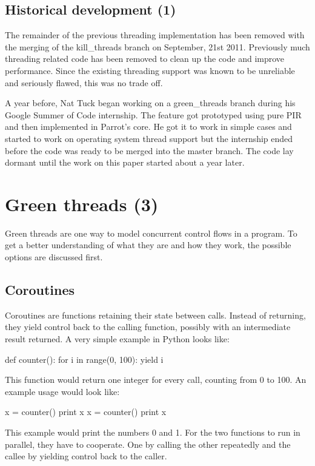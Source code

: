 \documentclass[bachelor,english]{hgbthesis}
\begin{document}
\section{Historical development (1)}

The remainder of the previous threading implementation has been removed with the merging of the kill\_threads branch on September, 21st 2011. Previously much threading related code has been removed to clean up the code and improve performance. Since the existing threading support was known to be unreliable and seriously flawed, this was no trade off.

A year before, Nat Tuck began working on a green\_threads branch during his Google Summer of Code internship. The feature got prototyped using pure PIR and then implemented in Parrot's core. He got it to work in simple cases and started to work on operating system thread support but the internship ended before the code was ready to be merged into the master branch. The code lay dormant until the work on this paper started about a year later.

\chapter{Green threads (3)}
\label{cha:green_threads}

Green threads are one way to model concurrent control flows in a program. To get a better understanding of what they are and how they work, the possible options are discussed first.

\section{Coroutines}

Coroutines are functions retaining their state between calls. Instead of returning, they yield control back to the calling function, possibly with an intermediate result returned. A very simple example in Python looks like:
\begin{GenericCode}
def counter():
    for i in range(0, 100):
	yield i
\end{GenericCode}
This function would return one integer for every call, counting from 0 to 100. An example usage would look like:
\begin{GenericCode}
x = counter()
print x
x = counter()
print x
\end{GenericCode}
This example would print the numbers 0 and 1. For the two functions to run in parallel, they have to cooperate. One by calling the other repeatedly and the callee by yielding control back to the caller.
\end{document}
